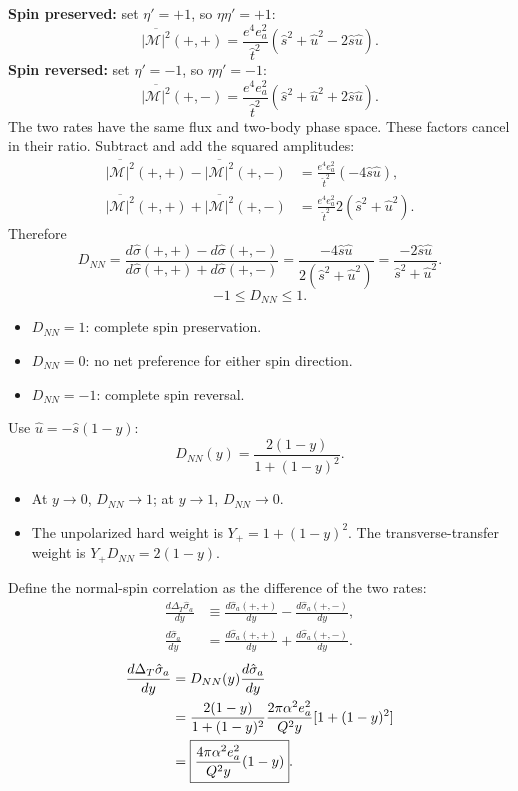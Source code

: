 \documentclass[14pt,a4paper]{extarticle}
\numberwithin{equation}{section}
\newcommand{\M}{\mathcal M}
\begin{document}
\textbf{Spin preserved:} set $\eta'=+1$, so $\eta\eta'=+1$:
\begin{equation}
 \overline{|\M|^2}(+,+)
 =\frac{e^4e_a^2}{\hat t^2}
  (\hat s^2+\hat u^2-2\hat s\hat u).
\end{equation}
\textbf{Spin reversed:} set $\eta'=-1$, so $\eta\eta'=-1$:
\begin{equation}
 \overline{|\M|^2}(+,-)
 =\frac{e^4e_a^2}{\hat t^2}
  (\hat s^2+\hat u^2+2\hat s\hat u).
\end{equation}
The two rates have the same flux and two-body phase space.
These factors cancel in their ratio. Subtract and add the squared
amplitudes:
\begin{align}
 \overline{|\M|^2}(+,+)-\overline{|\M|^2}(+,-)
 &=\frac{e^4e_a^2}{\hat t^2}(-4\hat s\hat u),\\
 \overline{|\M|^2}(+,+)+\overline{|\M|^2}(+,-)
 &=\frac{e^4e_a^2}{\hat t^2}
   2(\hat s^2+\hat u^2).
\end{align}
Therefore
\begin{equation}
 D_{NN}
 =\frac{d\hat\sigma(+,+)-d\hat\sigma(+,-)}
        {d\hat\sigma(+,+)+d\hat\sigma(+,-)}
 =\frac{-4\hat s\hat u}{2(\hat s^2+\hat u^2)}
 =\boxed{\frac{-2\hat s\hat u}{\hat s^2+\hat u^2}}.
\end{equation}
\begin{equation}
-1\leq D_{NN}\leq 1.
\end{equation}
\begin{itemize}
    \item $D_{NN}=1$: complete spin preservation.
    \item $D_{NN}=0$: no net preference for either spin direction.
    \item $D_{NN}=-1$: complete spin reversal.
\end{itemize}
Use $\hat u=-\hat s(1-y)$:
\begin{equation}
 \boxed{D_{NN}(y)=\frac{2(1-y)}{1+(1-y)^2}.}
 \label{eq:dihadron-DNN}
\end{equation}
\begin{itemize}
 \item At $y\to0$, $D_{NN}\to1$; at $y\to1$, $D_{NN}\to0$.
 \item The unpolarized hard weight is $Y_+=1+(1-y)^2$.
 The transverse-transfer weight is $Y_+D_{NN}=2(1-y)$.
\end{itemize}
Define the normal-spin correlation as the difference of the two rates:
\begin{align}
 \frac{d\Delta_T\hat\sigma_a}{dy}
 &\equiv\frac{d\hat\sigma_a(+,+)}{dy}
       -\frac{d\hat\sigma_a(+,-)}{dy},\\
 \frac{d\hat\sigma_a}{dy}
 &=\frac{d\hat\sigma_a(+,+)}{dy}
  +\frac{d\hat\sigma_a(+,-)}{dy}.
\end{align}
\begin{align}
 \frac{d\Delta_T\hat\sigma_a}{dy}
 &=D_{NN}(y)\frac{d\hat\sigma_a}{dy}\notag\\
 &=\frac{2(1-y)}{1+(1-y)^2}
   \frac{2\pi\alpha^2e_a^2}{Q^2y}
   [1+(1-y)^2]\notag\\
 &=\boxed{\frac{4\pi\alpha^2e_a^2}{Q^2y}(1-y)}.
\end{align}
\end{document}
